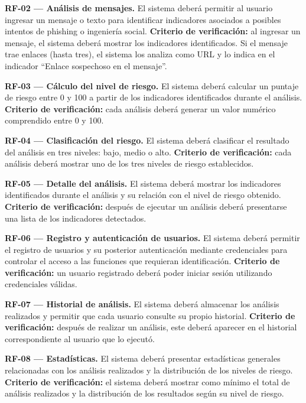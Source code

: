 \documentclass[journal,onecolumn,12pt,draftclsnofoot]{IEEEtran}
\begin{document}
\par\medskip\noindent\textbf{RF-02 --- Análisis de mensajes.} El sistema deberá permitir al usuario ingresar un mensaje o texto para identificar indicadores asociados a posibles intentos de phishing o ingeniería social. \textbf{Criterio de verificación:} al ingresar un mensaje, el sistema deberá mostrar los indicadores identificados. Si el mensaje trae enlaces (hasta tres), el sistema los analiza como URL y lo indica en el indicador ``Enlace sospechoso en el mensaje''.

\par\medskip\noindent\textbf{RF-03 --- Cálculo del nivel de riesgo.} El sistema deberá calcular un puntaje de riesgo entre 0 y 100 a partir de los indicadores identificados durante el análisis. \textbf{Criterio de verificación:} cada análisis deberá generar un valor numérico comprendido entre 0 y 100.

\par\medskip\noindent\textbf{RF-04 --- Clasificación del riesgo.} El sistema deberá clasificar el resultado del análisis en tres niveles: bajo, medio o alto. \textbf{Criterio de verificación:} cada análisis deberá mostrar uno de los tres niveles de riesgo establecidos.

\par\medskip\noindent\textbf{RF-05 --- Detalle del análisis.} El sistema deberá mostrar los indicadores identificados durante el análisis y su relación con el nivel de riesgo obtenido. \textbf{Criterio de verificación:} después de ejecutar un análisis deberá presentarse una lista de los indicadores detectados.

\par\medskip\noindent\textbf{RF-06 --- Registro y autenticación de usuarios.} El sistema deberá permitir el registro de usuarios y su posterior autenticación mediante credenciales para controlar el acceso a las funciones que requieran identificación. \textbf{Criterio de verificación:} un usuario registrado deberá poder iniciar sesión utilizando credenciales válidas.

\par\medskip\noindent\textbf{RF-07 --- Historial de análisis.} El sistema deberá almacenar los análisis realizados y permitir que cada usuario consulte su propio historial. \textbf{Criterio de verificación:} después de realizar un análisis, este deberá aparecer en el historial correspondiente al usuario que lo ejecutó.

\par\medskip\noindent\textbf{RF-08 --- Estadísticas.} El sistema deberá presentar estadísticas generales relacionadas con los análisis realizados y la distribución de los niveles de riesgo. \textbf{Criterio de verificación:} el sistema deberá mostrar como mínimo el total de análisis realizados y la distribución de los resultados según su nivel de riesgo.
\end{document}
